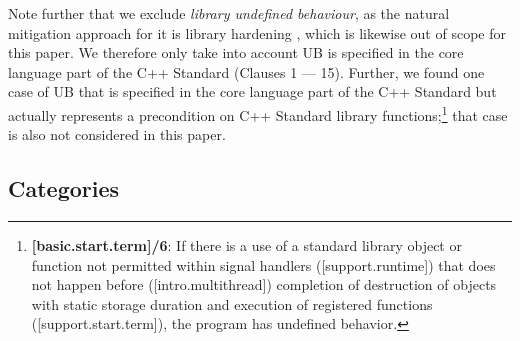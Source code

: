 Note further that we exclude \emph{library undefined behaviour}, as the natural mitigation approach for it is library hardening \cite{P3471R4}, which is likewise out of scope for this paper. We therefore only take into account UB is specified in the core language part of the C++ Standard (Clauses 1 --- 15). Further, we found one case of UB that is specified in the core language part of the C++ Standard but actually represents a precondition on C++ Standard library functions;\footnote{\textbf{[basic.start.term]/6}: If there is a use of a standard library object or function not permitted within signal handlers ([support.runtime]) that does not happen before ([intro.multithread]) completion of destruction of objects with static storage duration and execution of  registered functions ([support.start.term]), the program has undefined behavior.}
that case is also not considered in this paper.

\subsection{Categories}
\label{categories}

